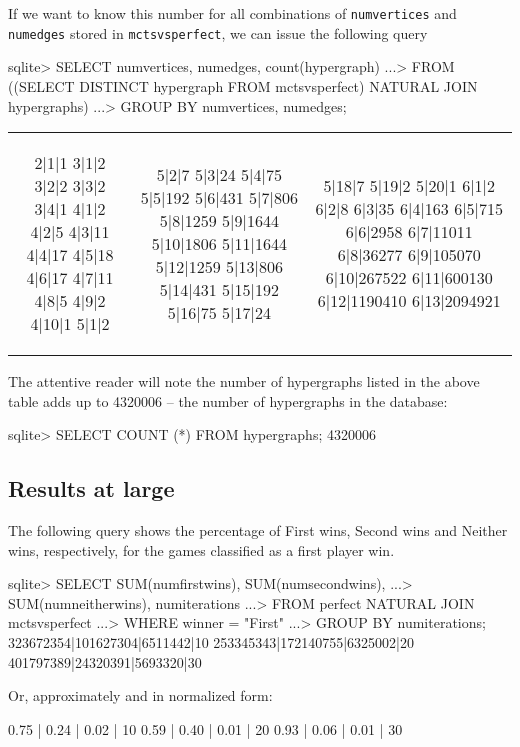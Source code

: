 If we want to know this number for all combinations of \texttt{numvertices} and \texttt{numedges} stored in \texttt{mctsvsperfect}, we can issue the following query
\begin{code}
sqlite> SELECT numvertices, numedges, count(hypergraph)
   ...> FROM ((SELECT DISTINCT hypergraph FROM mctsvsperfect) NATURAL JOIN hypergraphs)
   ...> GROUP BY numvertices, numedges;
\end{code}
\begin{tabular}{|c|c|c|}
\begin{minipage}{1.0in}
\begin{output}
2|1|1
3|1|2
3|2|2
3|3|2
3|4|1
4|1|2
4|2|5
4|3|11
4|4|17
4|5|18
4|6|17
4|7|11
4|8|5
4|9|2
4|10|1
5|1|2
\end{output}
\end{minipage}
&
\begin{minipage}{1.0in}
\begin{output}
5|2|7
5|3|24
5|4|75
5|5|192
5|6|431
5|7|806
5|8|1259
5|9|1644
5|10|1806
5|11|1644
5|12|1259
5|13|806
5|14|431
5|15|192
5|16|75
5|17|24
\end{output}
\end{minipage}
&
\begin{minipage}{1.0in}
\begin{output}
5|18|7
5|19|2
5|20|1
6|1|2
6|2|8
6|3|35
6|4|163
6|5|715
6|6|2958
6|7|11011
6|8|36277
6|9|105070
6|10|267522
6|11|600130
6|12|1190410
6|13|2094921
\end{output}
\end{minipage}
\\
\end{tabular}

The attentive reader will note the number of hypergraphs listed in the above table adds up to 4320006 -- the number of hypergraphs in the database:
\begin{code}
sqlite> SELECT COUNT (*) FROM hypergraphs;
4320006
\end{code}

\subsection{Results at large}

The following query shows the percentage of First wins, Second wins and Neither wins, respectively, for the games classified as a first player win.
\begin{code}
sqlite> SELECT SUM(numfirstwins), SUM(numsecondwins),
   ...>        SUM(numneitherwins), numiterations
   ...> FROM perfect NATURAL JOIN mctsvsperfect
   ...> WHERE winner = "First"
   ...> GROUP BY numiterations;
323672354|101627304|6511442|10
253345343|172140755|6325002|20
401797389|24320391|5693320|30
\end{code}
Or, approximately and in normalized form:
\begin{code}
0.75 | 0.24 | 0.02 | 10
0.59 | 0.40 | 0.01 | 20
0.93 | 0.06 | 0.01 | 30
\end{code}

